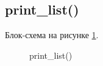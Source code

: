 




\subsection{print\_list()}

Блок-схема на рисунке \ref{fig:print_list}.

\begin{figure}[pht]
    \caption{print\_list()}
    \label{fig:print_list}
\end{figure}

